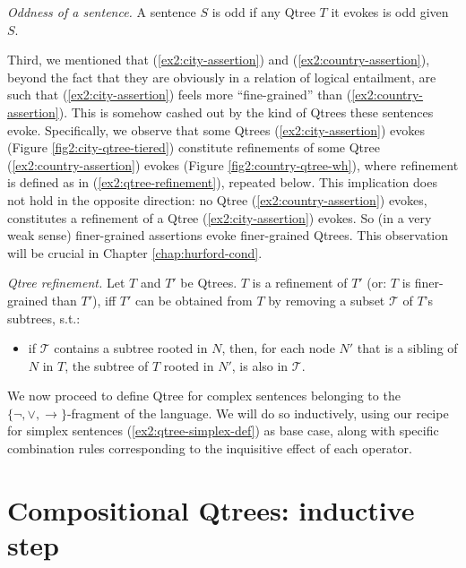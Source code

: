 \begin{exe}
	 {\textit{Oddness of a sentence.} A sentence $S$ is odd if any Qtree $T$ it evokes is odd given $S$.}
\end{exe}


Third, we mentioned that (\ref{ex2:city-assertion}) and (\ref{ex2:country-assertion}), beyond the fact that they are obviously in a relation of logical entailment, are such that (\ref{ex2:city-assertion}) feels more ``fine-grained'' than (\ref{ex2:country-assertion}). This is somehow cashed out by the kind of Qtrees these sentences evoke. Specifically, we observe that some Qtrees (\ref{ex2:city-assertion}) evokes (Figure \ref{fig2:city-qtree-tiered}) constitute refinements of some Qtree (\ref{ex2:country-assertion}) evokes (Figure \ref{fig2:country-qtree-wh}), where refinement is defined as in (\ref{ex2:qtree-refinement}), repeated below. This implication does not hold in the opposite direction: no Qtree (\ref{ex2:country-assertion}) evokes, constitutes a refinement of a Qtree (\ref{ex2:city-assertion}) evokes. So (in a very weak sense) finer-grained assertions evoke finer-grained Qtrees. This observation will be crucial in Chapter \ref{chap:hurford-cond}.

\begin{exe}
	 {\textit{Qtree refinement.} Let $T$ and $T'$ be Qtrees. $T$ is a refinement of $T'$ (or: $T$ is finer-grained than $T'$), iff $T'$ can be obtained from $T$ by removing a subset $\mathcal{T}$ of $T$'s subtrees, s.t.:
		\begin{itemize}
			\item if $\mathcal{T}$ contains a subtree rooted in $N$, then, for each node $N'$ that is a sibling of $N$ in $T$, the subtree of $T$ rooted in $N'$, is also in $\mathcal{T}$.
	\end{itemize}}
\end{exe}

We now proceed to define Qtree for complex sentences belonging to the $\lbrace \neg, \vee, \rightarrow\rbrace$-fragment of the language. We will do so inductively, using our recipe for simplex sentences (\ref{ex2:qtree-simplex-def}) as base case, along with specific combination rules corresponding to the inquisitive effect of each operator.


\section{Compositional Qtrees: inductive step}

